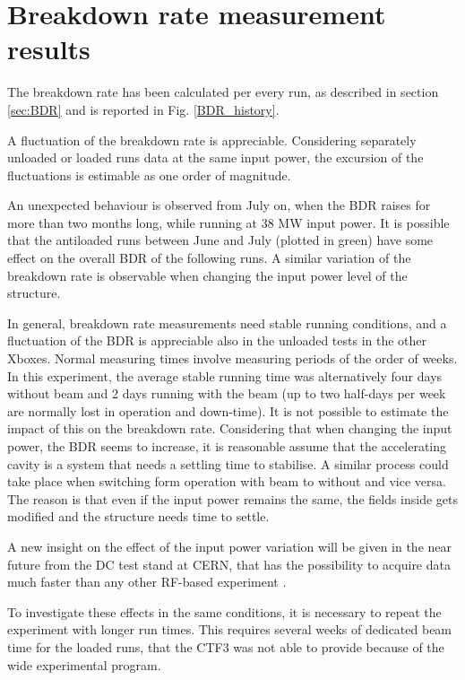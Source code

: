 \section[Breakdown rate measurement results]{Breakdown rate measurement results}

The breakdown rate has been calculated per every run, as described in section \ref{sec:BDR} and is reported in Fig. \ref{BDR_history}. 

A fluctuation of the breakdown rate is appreciable. Considering separately unloaded or loaded runs data at the same input power, the excursion of the fluctuations is estimable as one order of magnitude. 

An unexpected behaviour is observed from July on, when the BDR raises for more than two months long, while running at 38 MW input power. It is possible that the antiloaded runs between June and July (plotted in green) have some effect on the overall BDR of the following runs. A similar variation of the breakdown rate is observable when changing the input power level of the structure.

In general, breakdown rate measurements need stable running conditions, and a fluctuation of the BDR is appreciable also in the unloaded tests in the other Xboxes. Normal measuring times involve measuring periods of the order of weeks. In this experiment, the average stable running time was alternatively four days without beam and 2 days running with the beam (up to two half-days per week are normally lost in operation and down-time). It is not possible to estimate the impact of this on the breakdown rate. Considering that when changing the input power, the BDR seems to increase, it is reasonable assume that the accelerating cavity is a system that needs a settling time to stabilise. A similar process could take place when switching form operation with beam to without and vice versa. The reason is that even if the input power remains the same, the fields inside gets modified and the structure needs time to settle. 

A new insight on the effect of the input power variation will be given in the near future from the DC test stand at CERN, that has the possibility to acquire data much faster than any other RF-based experiment \cite{Walter:PC}.

To investigate these effects in the same conditions, it is necessary to repeat the experiment with longer run times. This requires several weeks of dedicated beam time for the loaded runs, that the CTF3 was not able to provide because of the wide experimental program.

